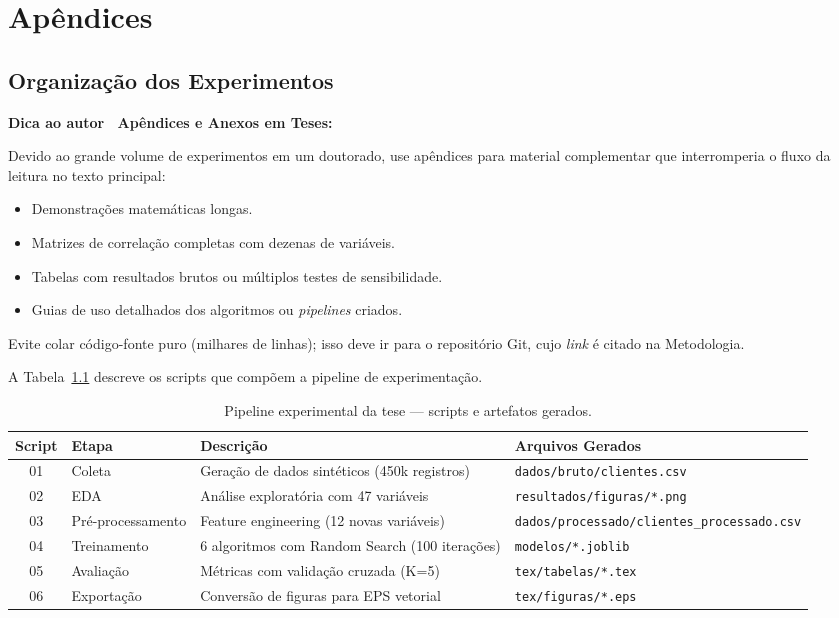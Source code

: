 \documentclass[
    12pt,
    oneside,
    a4paper,
    english,
    brazilian
    ]{abntex2}
\numberwithin{equation}{chapter}
\newenvironment{dica}{%
    \par\medskip
    \color{blue!60!black}\small\itshape
}{%
    \par\medskip
}
\begin{document}
\part*{Apêndices}

\chapter{Organização dos Experimentos}

\begin{dica}
\noindent\textbf{Dica ao autor \textemdash\ Apêndices e Anexos em Teses:}

Devido ao grande volume de experimentos em um doutorado, use apêndices para material complementar que interromperia o fluxo da leitura no texto principal:
\begin{itemize}
    \item Demonstrações matemáticas longas.
    \item Matrizes de correlação completas com dezenas de variáveis.
    \item Tabelas com resultados brutos ou múltiplos testes de sensibilidade.
    \item Guias de uso detalhados dos algoritmos ou \textit{pipelines} criados.
\end{itemize}
Evite colar código-fonte puro (milhares de linhas); isso deve ir para o repositório Git, cujo \textit{link} é citado na Metodologia.
\end{dica}

A Tabela~\ref{tab:pipeline_tese} descreve os scripts que compõem a pipeline de experimentação.

\begin{table}[htbp]
\centering
\caption{Pipeline experimental da tese --- scripts e artefatos gerados.}
\label{tab:pipeline_tese}
\small
\begin{tabular}{cllp{5cm}}
\toprule
\textbf{Script} & \textbf{Etapa} & \textbf{Descrição} & \textbf{Arquivos Gerados} \\
\midrule
01 & Coleta & Geração de dados sintéticos (450k registros) & \texttt{dados/bruto/clientes.csv} \\
02 & EDA & Análise exploratória com 47 variáveis & \texttt{resultados/figuras/*.png} \\
03 & Pré-processamento & Feature engineering (12 novas variáveis) & \texttt{dados/\allowbreak processado/\allowbreak clientes\_processado.csv} \\
04 & Treinamento & 6 algoritmos com Random Search (100 iterações) & \texttt{modelos/*.joblib} \\
05 & Avaliação & Métricas com validação cruzada (K=5) & \texttt{tex/tabelas/*.tex} \\
06 & Exportação & Conversão de figuras para EPS vetorial & \texttt{tex/figuras/*.eps} \\
\bottomrule
\end{tabular}
\end{table}
\end{document}
